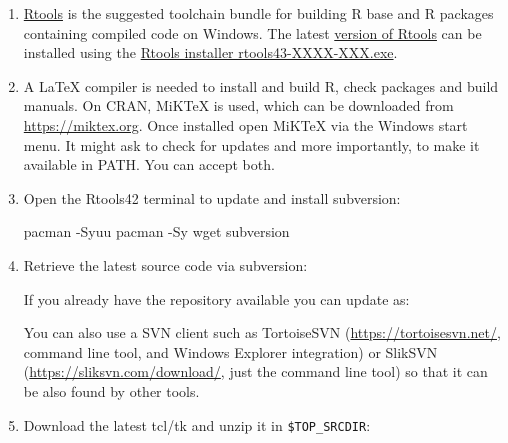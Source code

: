 \documentclass[
]{book}
\newenvironment{Shaded}{\begin{snugshade}}{\end{snugshade}}
\newcommand{\AttributeTok}[1]{\textcolor[rgb]{0.77,0.63,0.00}{#1}}
\newcommand{\BuiltInTok}[1]{#1}
\newcommand{\ExtensionTok}[1]{#1}
\newcommand{\FunctionTok}[1]{\textcolor[rgb]{0.00,0.00,0.00}{#1}}
\newcommand{\NormalTok}[1]{#1}
\newcommand{\OperatorTok}[1]{\textcolor[rgb]{0.81,0.36,0.00}{\textbf{#1}}}
\newcommand{\StringTok}[1]{\textcolor[rgb]{0.31,0.60,0.02}{#1}}
\newcommand{\VariableTok}[1]{\textcolor[rgb]{0.00,0.00,0.00}{#1}}
\begin{document}
\begin{enumerate}
\def\labelenumi{\arabic{enumi}.}
\item
  \href{https://cran.r-project.org/bin/windows/Rtools/}{Rtools} is the suggested toolchain bundle for building R base and R packages containing compiled code on Windows.
  The latest \href{https://cran.r-project.org/bin/windows/Rtools/rtools43/rtools.html}{version of Rtools} can be installed using the \href{https://cran.r-project.org/bin/windows/Rtools/rtools43/files/}{Rtools installer rtools43-XXXX-XXX.exe}.
\item
  A LaTeX compiler is needed to install and build R, check packages and build manuals.
  On CRAN, MiKTeX is used, which can be downloaded from \url{https://miktex.org}.
  Once installed open MiKTeX via the Windows start menu.
  It might ask to check for updates and more importantly, to make it available in PATH. You can accept both.
\item
  Open the Rtools42 terminal to update and install subversion:

\begin{Shaded}
\begin{Highlighting}[]
\ExtensionTok{pacman} \AttributeTok{{-}Syuu}
\ExtensionTok{pacman} \AttributeTok{{-}Sy}\NormalTok{ wget subversion}
\end{Highlighting}
\end{Shaded}
\item
  Retrieve the latest source code via subversion:

\begin{Shaded}
\end{Shaded}

  If you already have the repository available you can update as:

\begin{Shaded}
\end{Shaded}

  You can also use a SVN client such as TortoiseSVN (\url{https://tortoisesvn.net/}, command line tool, and Windows Explorer integration) or SlikSVN (\url{https://sliksvn.com/download/}, just the command line tool) so that it can be also found by other tools.
\item
  Download the latest tcl/tk and unzip it in \texttt{\$TOP\_SRCDIR}:


\end{enumerate}
\end{document}
